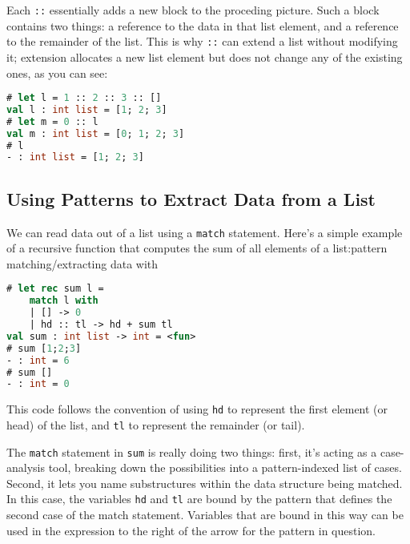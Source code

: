Each \passthrough{\lstinline!::!} essentially adds a new block to the
proceding picture. Such a block contains two things: a reference to the
data in that list element, and a reference to the remainder of the list.
This is why \passthrough{\lstinline!::!} can extend a list without
modifying it; extension allocates a new list element but does not change
any of the existing ones, as you can see:

\begin{lstlisting}[language=Caml]
# let l = 1 :: 2 :: 3 :: []
val l : int list = [1; 2; 3]
# let m = 0 :: l
val m : int list = [0; 1; 2; 3]
# l
- : int list = [1; 2; 3]
\end{lstlisting}

\hypertarget{using-patterns-to-extract-data-from-a-list}{%
\subsection{Using Patterns to Extract Data from a
List}\label{using-patterns-to-extract-data-from-a-list}}

We can read data out of a list using a \passthrough{\lstinline!match!}
statement. Here's a simple example of a recursive function that computes
the sum of all elements of a
list:\protect\hypertarget{PATMAT}{}{pattern
matching/extracting data with}

\begin{lstlisting}[language=Caml]
# let rec sum l =
    match l with
    | [] -> 0
    | hd :: tl -> hd + sum tl
val sum : int list -> int = <fun>
# sum [1;2;3]
- : int = 6
# sum []
- : int = 0
\end{lstlisting}

This code follows the convention of using \passthrough{\lstinline!hd!}
to represent the first element (or head) of the list, and
\passthrough{\lstinline!tl!} to represent the remainder (or tail).

The \passthrough{\lstinline!match!} statement in
\passthrough{\lstinline!sum!} is really doing two things: first, it's
acting as a case-analysis tool, breaking down the possibilities into a
pattern-indexed list of cases. Second, it lets you name substructures
within the data structure being matched. In this case, the variables
\passthrough{\lstinline!hd!} and \passthrough{\lstinline!tl!} are bound
by the pattern that defines the second case of the match statement.
Variables that are bound in this way can be used in the expression to
the right of the arrow for the pattern in question.

